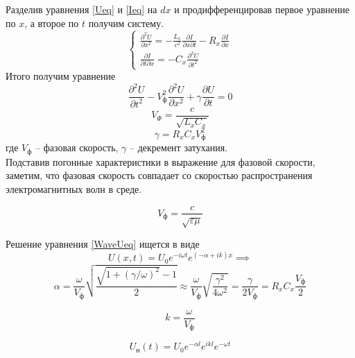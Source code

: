 \documentclass{report}
\begin{document}
Разделив уравнения \eqref{Ueq} и \eqref{Ieq} на $dx$ и
продифференцировав первое уравнение по $x$, а второе по $t$
получим систему.
\begin{equation}\label{WaveSystUeq}
	\begin{cases}
		\frac{\partial^2 U}{\partial x^2}=-\frac{L_x}{c^2}\frac{\partial I}{\partial x\partial t}-R_x\frac{\partial I}{\partial x}
		\\
		\frac{\partial I}{\partial t\partial x}=-C_x\frac{\partial^2 U}{\partial t^2}
	\end{cases}
\end{equation}
Итого получим уравнение
\begin{equation}\label{WaveUeq}
	\frac{\partial^2 U}{\partial t^2}-V^2_\text{ф}\frac{\partial^2 U}{\partial x^2}+\gamma\frac{\partial U}{\partial t}=0
\end{equation}
\begin{equation}
	V_\Phi=\frac{c}{\sqrt{L_xC_x}}
\end{equation}
\begin{equation}
	\gamma=R_xC_xV^2_\text{ф}
\end{equation}
где $V_\text{ф}$ -- фазовая скорость,
$\gamma$ -- декремент затухания.\\
Подставив погонные
характеристики в выражение для фазовой скорости, заметим, что фазовая скорость
совпадает со скоростью распространения электромагнитных волн в среде.

\begin{equation}
	V_\text{ф}=\frac{c}{\sqrt{\varepsilon\mu}}
\end{equation}

Решение уравнения \eqref{WaveUeq} ищется в виде
\begin{equation}\label{WaveUsol}
	U(x,t)=U_0e^{-i\omega t}e^{(-\alpha+ik)x} \implies
\end{equation}
\begin{equation}\label{alphaSol}
	\alpha=\frac{\omega}{V_\text{ф}}\sqrt{\frac{\sqrt{1+(\gamma/\omega)^2}-1}{2}}\approx
	\frac{\omega}{V_\text{ф}}\sqrt{\frac{\gamma^2}{4\omega^2}}=
	\frac{\gamma}{2V_\text{ф}}=R_xC_x\frac{V_\text{ф}}{2}
\end{equation}

\begin{equation}\label{kSol}
	k=\frac{\omega}{V_\text{ф}}
\end{equation}

\begin{equation}\label{Un}
	U_\text{н}(t)=U_0e^{-\alpha l}e^{ikl}e^{-\omega t}
\end{equation}
\end{document}
